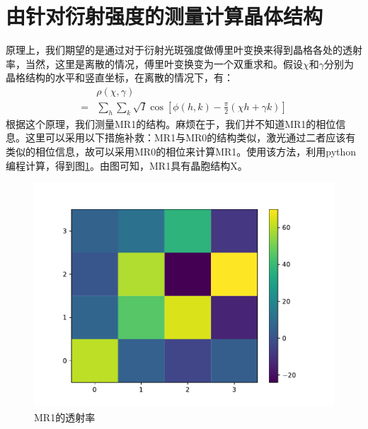 \documentclass[fleqn,10pt]{SelfArx} %
\begin{document}
\section{由针对衍射强度的测量计算晶体结构}

原理上，我们期望的是通过对于衍射光斑强度做傅里叶变换来得到晶格各处的透射率，当然，这里是离散的情况，傅里叶变换变为一个双重求和。假设$\chi$和$\gamma$分别为晶格结构的水平和竖直坐标，在离散的情况下，有：
\begin{equation*}
	\begin{aligned}
		&\rho(\chi,\gamma) \\ 
		=&\sum_h\sum_k\sqrt{I}\cos{[\phi(h,k)-\frac{\pi}{2}(\chi h+\gamma k)]}
	\end{aligned}
\end{equation*}
根据这个原理，我们测量MR1的结构。麻烦在于，我们并不知道MR1的相位信息。这里可以采用以下措施补救：MR1与MR0的结构类似，激光通过二者应该有类似的相位信息，故可以采用MR0的相位来计算MR1。使用该方法，利用python编程计算，得到图\ref{fig:1}。由图可知，MR1具有晶胞结构X。
\begin{figure}[htbp]
\centering
	\includegraphics[width=\linewidth]{mr1.pdf}
	\caption{MR1的透射率}
	\label{fig:1}
\end{figure}




\end{document}

